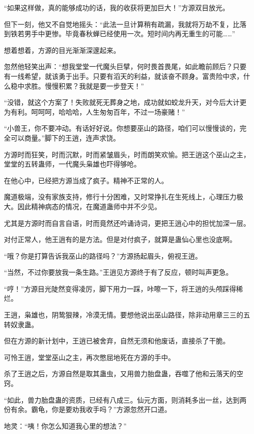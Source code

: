 \begin{this_body}
“如果这样做，真的能够成功的话，我的收获将更加巨大！”方源双目放光。

但下一刻，他又不自觉地摇头：“此法一旦计算稍有疏漏，我就将万劫不复，比落到铁若男手中更惨。毕竟春秋蝉已经使用一次。短时间内再无重生的可能……”

想着想着，方源的目光渐渐深邃起来。

忽然他轻笑出声：“想我堂堂一代魔头巨擘，何时畏首畏尾，如此瞻前顾后？只要有一线希望，就该勇于出手。只要有滔天的利益，就该奋不顾身。富贵险中求，什么稳中求胜。慢慢积累？我就是要一步登天！”

“没错，就这个方案了！失败就死无葬身之地，成功就如蛟龙升天，对今后大计更为有利。呵呵呵，哈哈哈，人生匆匆百年，不过一场豪赌！”

“小兽王，你不要冲动。有话好好说。你想要巫山的路径，咱们可以慢慢谈的，完全可以商量。”脚下的王逍，连声求饶。

方源时而狂笑，时而沉默，时而紧皱眉头，时而朗笑欢愉。把王逍这个巫山之主，堂堂的五转蛊师，一代魔头枭雄也吓得够呛。

在他心中，已经把方源当成了疯子。精神不正常的人。

魔道极端，没有家族支持，修行十分困难，又时常挣扎在生死线上，心理压力极大。因此精神病态的情况，在魔道蛊师中并不少见。

尤其是方源时而自言自语，时而竟然还吟诵诗词，更把王逍心中的担忧加深一层。

对付正常人，他王逍有的是方法。但是对付疯子，就算是蛊仙心里也没底啊。

“哦？你是打算告诉我巫山的路径吗？”方源扬起眉头，俯视王逍。

“当然，不过你要放我一条生路。”王逍见方源终于有了反应，顿时叫声更急。

“哼！”方源目光陡然变得凌厉，脚下用力一踩，咔嚓一下，将王逍的头颅踩得稀烂。

王逍，枭雄也，阴鸷狠辣，冷漠无情。要想他说出巫山路径，除非动用章三三的五转奴隶蛊。

但在方源的新计划中，王逍已被舍弃，自然无须和他废话，直接杀了干脆。

可怜王逍，堂堂巫山之主，再次憋屈地死在方源的手中。

杀了王逍之后，方源自然是取其蛊虫，又用兽力胎盘蛊，吞噬了他和云落天的空窍。

“如此，兽力胎盘蛊的资质，已经有八成三。仙元方面，则消耗多出一丝，达到两份有余。霸龟，你是要劝我收手吗？”方源忽然开口道。

地灵：“咦！你怎么知道我心里的想法？”


\end{this_body}
